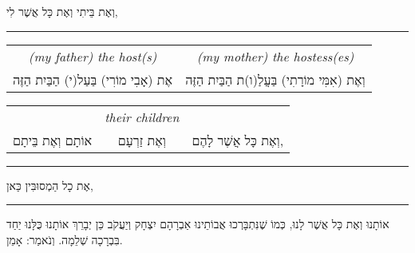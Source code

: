 \begin{center}
וְאֶת בֵּיתִי וְאֶת כָּל אֲשֶׁר לִי,

\vspace{0.1em}
\hrule
\vspace{0.1em}


\begin{tabular}{c c}
\textenglish{\itshape (my father) the host(s)}
	& \textenglish{\itshape (my mother) the hostess(es)}\\

אֶת (אָבִי מוֹרִי) בַּעַל(י) הַבַּיִת הַזֶּה & וְאֶת (אִמִּי מוֹרָתִי) בַּעֲלַ(ו)ת הַבַּיִת הַזֶּה \\
\end{tabular}

\begin{tabular}{c c c}
	& \textenglish{\itshape their children}
		& \\
אוֹתָם וְאֶת בֵּיתָם & וְאֶת זַרְעָם & וְאֶת כָּל אֲשֶׁר לָהֶם, \\
\end{tabular}

\vspace{0.1em}
\hrule
\vspace{0.1em}


אֶת כָל הַמְסוּבִּין כַּאן,

\vspace{0.1em}
\hrule
\vspace{0.1em}


אוֹתָנוּ וְאֶת כָּל אֲשֶׁר לָנוּ, כְּמוֹ שֶׁנִּתְבָּרְכוּ אֲבוֹתֵינוּ אַבְרָהָם יִצְחָק וְיַעֲקֹב
כֵּן יְבָרֵךְ אוֹתָנוּ כֻּלָּנוּ יַחַד בִּבְרָכָה שְׁלֵמָה. וְנֹאמַר: אָמֵן.

\end{center}

